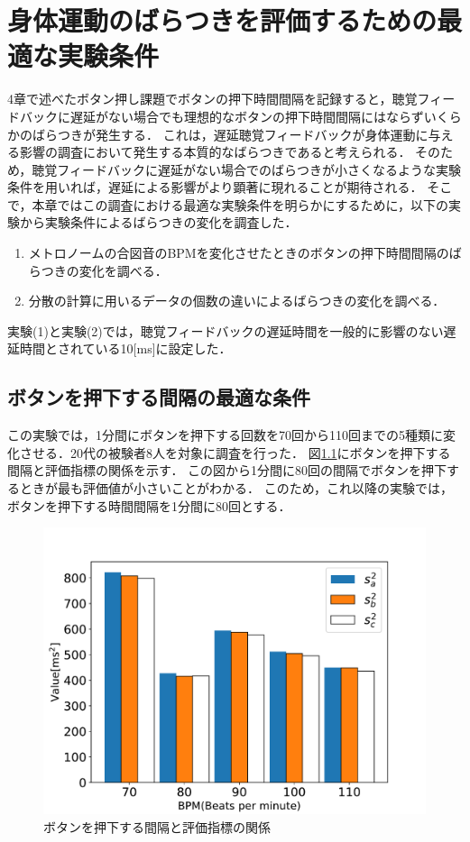 \chapter{身体運動のばらつきを評価するための最適な実験条件}
4章で述べたボタン押し課題でボタンの押下時間間隔を記録すると，聴覚フィードバックに遅延がない場合でも理想的なボタンの押下時間間隔にはならずいくらかのばらつきが発生する．
これは，遅延聴覚フィードバックが身体運動に与える影響の調査において発生する本質的なばらつきであると考えられる．
そのため，聴覚フィードバックに遅延がない場合でのばらつきが小さくなるような実験条件を用いれば，遅延による影響がより顕著に現れることが期待される．
そこで，本章ではこの調査における最適な実験条件を明らかにするために，以下の実験から実験条件によるばらつきの変化を調査した．
\begin{enumerate}[leftmargin=*, label=実験(\arabic*)] %
  \item メトロノームの合図音のBPMを変化させたときのボタンの押下時間間隔のばらつきの変化を調べる．
  \item 分散の計算に用いるデータの個数の違いによるばらつきの変化を調べる．
\end{enumerate}
実験(1)と実験(2)では，聴覚フィードバックの遅延時間を一般的に影響のない遅延時間とされている10[ms]に設定した．
\section{ボタンを押下する間隔の最適な条件}
この実験では，1分間にボタンを押下する回数を70回から110回までの5種類に変化させる．20代の被験者8人を対象に調査を行った．
図\ref{fig:bpm}にボタンを押下する間隔と評価指標の関係を示す．
この図から1分間に80回の間隔でボタンを押下するときが最も評価値が小さいことがわかる．
このため，これ以降の実験では，ボタンを押下する時間間隔を1分間に80回とする．
\begin{figure}[b]
  \centering
  \includegraphics[scale=0.6]{figures/Yobi/Var/BPM-Change-Var.pdf}
  \caption{ボタンを押下する間隔と評価指標の関係}
  \label{fig:bpm}
\end{figure}
